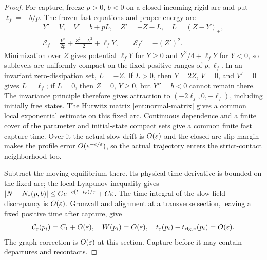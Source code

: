 \begin{proof}
For capture, freeze $p>0$, $b<0$ on a closed incoming rigid arc and
put $\ell_f=-b/p$. The frozen fast equations and proper energy are
\[
 \begin{gathered}
 Y'=V,\quad V'=b+pL,\quad Z'=-Z-L,\quad L=(Z-Y)_+,
 \\
 \mathcal E_f=\frac{V^2}{2p}+\frac{Z^2+L^2}{2}+\ell_fY,
 \qquad \mathcal E_f'=-(Z')^2.
 \end{gathered}
\]
Minimization over $Z$ gives potential $\ell_fY$ for $Y\ge0$ and
$Y^2/4+\ell_fY$ for $Y<0$, so sublevels are uniformly compact
on the fixed positive ranges of $p,\ell_f$. In an invariant
zero-dissipation set, $L=-Z$. If $L>0$, then $Y=2Z$, $V=0$,
and $V'=0$ gives $L=\ell_f$; if $L=0$, then $Z=0$, $Y\ge0$,
but $Y''=b<0$ cannot remain there. The invariance principle therefore
gives attraction to $(-2\ell_f,0,-\ell_f)$, including initially
free states. The Hurwitz matrix \eqref{ent:normal-matrix} gives a
common local exponential estimate on this fixed arc. Continuous
dependence and a finite cover of the parameter and initial-state
compact sets give a common finite fast capture time. Over it the
actual slow drift is $O(\varepsilon)$ and the closed-arc slip margin makes
the profile error $O(e^{-c/\varepsilon})$, so the actual trajectory enters
the strict-contact neighborhood too.

Subtract the moving equilibrium there. Its physical-time derivative
is bounded on the fixed arc; the local Lyapunov inequality gives
$|N-N_*(p,b)|\le Ce^{-c(t-t_c)/\varepsilon}+C\varepsilon$.
The time integral of the slow-field discrepancy is $O(\varepsilon)$.
Gronwall and alignment at a transverse section, leaving a fixed
positive time after capture, give
\begin{equation}
 \mathcal C_\varepsilon(p_i)=C_1+O(\varepsilon),\quad W(p_i)=O(\varepsilon),\quad
 t_\varepsilon(p_i)-t_{{\rm rig},\nu}(p_i)=O(\varepsilon).
 \label{ent:fixed-initialization}
\end{equation}
The graph correction is $O(\varepsilon)$ at this section. Capture before it
may contain departures and recontacts.


\end{proof}
